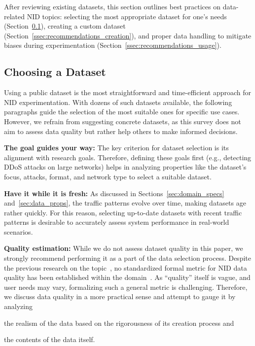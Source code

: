 After reviewing existing datasets, this section outlines best practices on data-related NID topics: selecting the most appropriate dataset for one’s needs (Section~\ref{ssec:recommendations_selection}), creating a custom dataset (Section~\ref{ssec:recommendations_creation}), and proper data handling to mitigate biases during experimentation (Section~\ref{ssec:recommendations_usage}).

\subsection{Choosing a Dataset}
\label{ssec:recommendations_selection}

Using a public dataset is the most straightforward and time-efficient approach for NID experimentation. With dozens of such datasets available, the following paragraphs guide the selection of the most suitable ones for specific use cases. However, we refrain from suggesting concrete datasets, as this survey does not aim to assess data quality but rather help others to make informed decisions.

\textbf{The goal guides your way:} The key criterion for dataset selection is its alignment with research goals. Therefore, defining these goals first (e.g., detecting DDoS attacks on large networks) helps in analyzing properties like the dataset's focus, attacks, format, and network type to select a suitable dataset.

\textbf{Have it while it is fresh:} As discussed in Sections~\ref{sec:domain_specs} and~\ref{sec:data_props}, the traffic patterns evolve over time, making datasets age rather quickly. For this reason, selecting up-to-date datasets with recent traffic patterns is desirable to accurately assess system performance in real-world scenarios.

\textbf{Quality estimation:} While we do not assess dataset quality in this paper, we strongly recommend performing it as a part of the data selection process. Despite the previous research on the topic~\cite{gharib2016_evaluation_framework_ids_data,haider2017_ngids_ds_dataset,soukup2021_towards_nids_data_quality_eval}, no standardized formal metric for NID data quality has been established within the domain~\cite{kenyon2020_public_ids_datasets_fit}. As ``quality'' itself is vague, and user needs may vary, formalizing such a general metric is challenging. Therefore, we discuss data quality in a more practical sense and attempt to gauge it by analyzing
\begin{enumerate*}[label=\alph*), topsep=0pt]
    \item the realism of the data based on the rigorousness of its creation process and
    \item the contents of the data itself.
\end{enumerate*}

